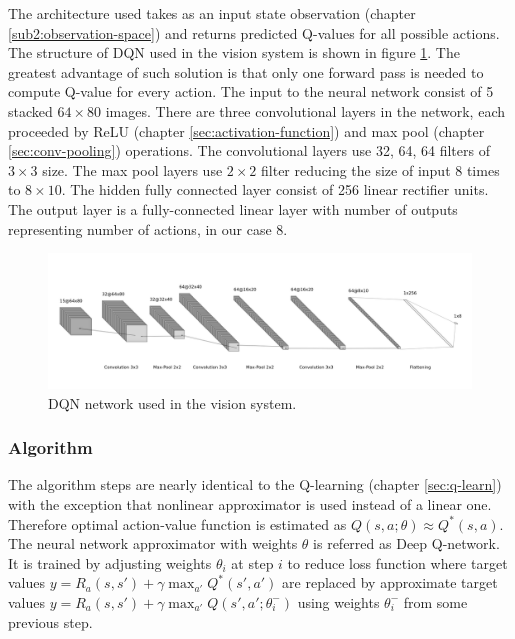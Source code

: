 The architecture used takes as an input state observation (chapter \ref{sub2:observation-space}) and returns predicted Q-values for all possible actions. The structure of DQN used in the vision system is shown in figure \ref{fig:dqn-network}. The greatest advantage of such solution is that only one forward pass is needed to compute Q-value for every action. The input to the neural network consist of 5 stacked $64 \times 80$ images. There are three convolutional layers in the network, each proceeded by ReLU
(chapter \ref{sec:activation-function}) and max pool (chapter \ref{sec:conv-pooling}) operations. The convolutional layers use 32, 64, 64 filters of $3 \times 3$
size. The max pool layers use $2 \times 2$ filter reducing the size of input $8$ times to $8 \times 10$. The hidden fully connected layer consist
of 256 linear rectifier units. The output layer is a fully-connected linear layer with number of outputs representing number of actions, in our
case $8$.

\begin{figure}[h]
    \centering
    \includegraphics[width=16cm]{img/model-architecture.png}
    \caption{DQN network used in the vision system.}
    \label{fig:dqn-network}
\end{figure}

\newpage

\subsubsection*{Algorithm}
\label{sub2:dqn-algorithm}

The algorithm steps are nearly identical to the Q-learning (chapter \ref{sec:q-learn}) with the exception that nonlinear approximator is used instead of a
linear one. Therefore optimal action-value function is estimated as $Q(s, a; \theta) \approx Q^*(s, a)$. The neural network approximator with
weights $\theta$ is referred as Deep Q-network. It is trained by adjusting weights $\theta_i$ at step $i$ to reduce loss function where target
values $y = R_a(s, s') + \gamma \max_{a'}Q^*(s', a')$ are replaced by approximate target values $y = R_a(s, s') + \gamma \max_{a'}Q(s',
a';\theta^-_i)$ using weights $\theta^-_i$ from some previous step.


